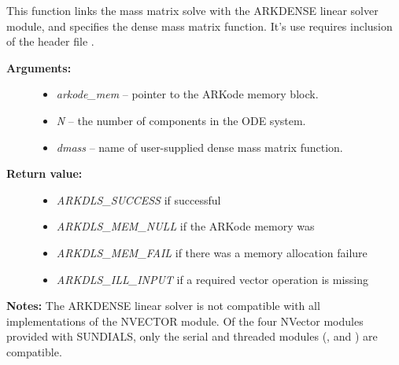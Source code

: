 \documentclass[letterpaper,10pt,english]{sphinxmanual}
\begin{document}
\begin{fulllineitems}
\label{c_interface/User_callable:c.ARKMassDense}
This function links the mass matrix solve with the ARKDENSE linear
solver module, and specifies the dense mass matrix function.  It's
use requires inclusion of the header file .
\begin{description}
\item[{\textbf{Arguments:}}] \leavevmode\begin{itemize}
\item {} 
\emph{arkode\_mem} -- pointer to the ARKode memory block.

\item {} 
\emph{N} -- the number of components in the ODE system.

\item {} 
\emph{dmass} -- name of user-supplied dense mass matrix function.

\end{itemize}

\item[{\textbf{Return value:}}] \leavevmode\begin{itemize}
\item {} 
\emph{ARKDLS\_SUCCESS}   if successful

\item {} 
\emph{ARKDLS\_MEM\_NULL}  if the ARKode memory was 

\item {} 
\emph{ARKDLS\_MEM\_FAIL}  if there was a memory allocation failure

\item {} 
\emph{ARKDLS\_ILL\_INPUT} if a required vector operation is missing

\end{itemize}

\end{description}

\textbf{Notes:}  The ARKDENSE linear solver is not compatible with all
implementations of the NVECTOR module. Of the four NVector
modules provided with SUNDIALS, only the serial and threaded
modules ({\hyperref[nvectors/NVector_Serial:nvectors-nvserial]{\emph{}}}, {\hyperref[nvectors/NVector_OpenMP:nvectors-openmp]{\emph{}}} and
{\hyperref[nvectors/NVector_Pthreads:nvectors-pthreads]{\emph{}}}) are compatible.

\end{fulllineitems}
\end{document}

